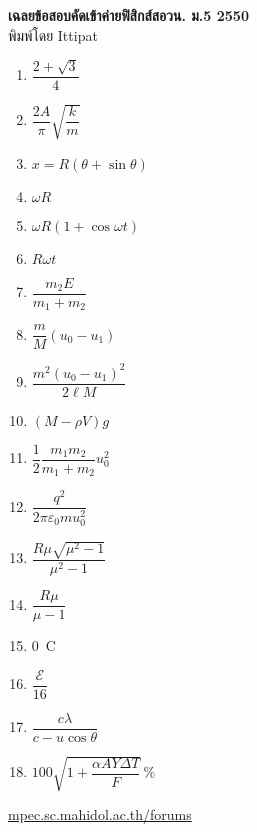 \documentclass[a4paper,12pt]{article}
\begin{document}
\thispagestyle{empty}
\begin{center}
	{\huge \textbf{เฉลยข้อสอบคัดเข้าค่ายฟิสิกส์สอวน. ม.\textenglish{5} 2550}}\\
	พิมพ์โดย Ittipat\\
\end{center}
\begin{enumerate}
	\item \(\dfrac{2 + \sqrt 3 }{4}\)
	\item \(\dfrac{2A}{\pi}\sqrt{\dfrac{k}{m}}\)
	\item \(x=R(\theta+\sin\theta)\)
	\item \(\omega R\)
	\item \(\omega R(1+\cos\omega t)\)
	\item \(R\omega t\)
	\item \(\dfrac{m_2E}{m_1+m_2}\)
	\item \(\dfrac{m}{M}\left( {u_0  - u_1 } \right)\)
	\item \(\dfrac{m^2 \left( {u_0  - u_1 } \right)^2 }{2\ell M}\)
	\item \((M-\rho V)g\)
	\item \(\dfrac{1}{2}\dfrac{m_1m_2}{m_1+m_2}u_0^2\)
	\item \(\dfrac{q^2}{2\pi \varepsilon_0mu_0^2}\)
	\item \(\dfrac{R\mu\sqrt{\mu^2-1}}{\mu^2-1}\)
	\item \(\dfrac{R\mu}{\mu -1}\)
	\item \SI{0}{C}
	\item \(\dfrac{\mathcal{E}}{16}\)
	\item \(\dfrac{c\lambda}{c-u\cos \theta}\)
	\item \(100\sqrt{1+\dfrac{\alpha AY\Delta T}{F}}\,\si{\%}\)
\end{enumerate}
\vfill	
\begin{center}
	\href{http://mpec.sc.mahidol.ac.th/forums/}{mpec.sc.mahidol.ac.th/forums}
\end{center}
\end{document}
